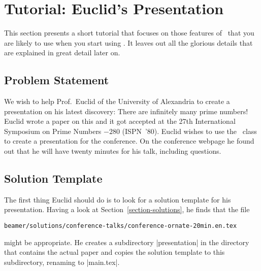 %
%
%


\section{Tutorial: Euclid's Presentation}
\label{section-tutorial}

This section presents a short tutorial that focuses on those features of \beamer\ that you are likely to use when you start using \beamer. It  leaves out all the glorious details that are explained in great detail later on.


\subsection{Problem Statement}

We wish to help Prof.\ Euclid of the University of Alexandria to create a presentation on his latest discovery: There are infinitely many prime numbers! Euclid wrote a paper on this and it got accepted at the 27th International Symposium on Prime Numbers $-280$ (ISPN~'80). Euclid wishes to use the \beamer\ class to create a presentation for the conference. On the conference webpage he found out that he will have twenty minutes for his talk, including questions.


\subsection{Solution Template}

The first thing Euclid should do is to look for a solution template for his presentation. Having a look at Section~\ref{section-solutions}, he finds that the file
\begin{verbatim}
beamer/solutions/conference-talks/conference-ornate-20min.en.tex
\end{verbatim}
might be appropriate. He creates a subdirectory |presentation| in the directory that contains the actual paper and copies the solution template to this subdirectory, renaming to |main.tex|.

